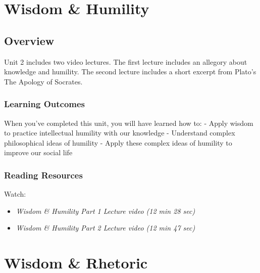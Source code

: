\documentclass[
]{book}
\providecommand{\tightlist}{%
  \setlength{\itemsep}{0pt}\setlength{\parskip}{0pt}}
\begin{document}
\hypertarget{wisdom-humility}{%
\chapter{Wisdom \& Humility}\label{wisdom-humility}}

\hypertarget{overview-1}{%
\section*{Overview}\label{overview-1}}

Unit 2 includes two video lectures. The first lecture includes an allegory about knowledge and humility. The second lecture includes a short excerpt from Plato's The Apology of Socrates.

\hypertarget{learning-outcomes-1}{%
\subsection*{Learning Outcomes}\label{learning-outcomes-1}}

When you've completed this unit, you will have learned how to:
- Apply wisdom to practice intellectual humility with our knowledge
- Understand complex philosophical ideas of humility
- Apply these complex ideas of humility to improve our social life

\hypertarget{reading-resources-1}{%
\subsection*{Reading Resources}\label{reading-resources-1}}

Watch:

\begin{itemize}
\tightlist
\item
  \emph{Wisdom \& Humility Part 1 Lecture video (12 min 28 sec)}
\end{itemize}

\begin{itemize}
\tightlist
\item
  \emph{Wisdom \& Humility Part 2 Lecture video (12 min 47 sec)}
\end{itemize}

\hypertarget{wisdom-rhetoric}{%
\chapter{Wisdom \& Rhetoric}\label{wisdom-rhetoric}}
\end{document}
